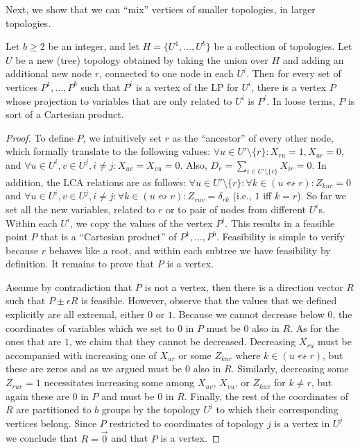 Next, we show that we can ``mix'' vertices of smaller topologies, in larger topologies.

\begin{theorem}
\label{theorem_combine_trees}
Let $b \ge 2$ be an integer, and let $H = \{ U^1,\ldots,U^b \} $ be a collection of topologies. Let $U$ be a new (tree) topology 
obtained by taking the union over $H$ and adding an additional new node $r$, connected to one node in each $U^i$.
 Then for every set of vertices $P^1,\ldots,P^b$ such that $P^i$ is a vertex of the LP for $U^i$, there is a vertex $P$ whose projection to variables that are only related to $U^i$ is $P^i$. In loose terms, $P$ is sort of a Cartesian product.
\end{theorem}

\begin{proof}
To define $P$, we intuitively set $r$ as the ``ancestor'' of every other node, which formally translate to the following values: $\forall u \in U' \setminus \{r\}: X_{ru} = 1, X_{ur} = 0$, and $\forall u \in U^i, v \in U^j, i \ne j: X_{uv}=X_{vu}=0$. Also, $D_r = \sum_{i \in U' \setminus\{r\}}{X_{ir}} = 0$. In addition, the LCA relations are as follows: $\forall u \in U' \setminus \{r\}: \forall k \in (u \leftrightsquigarrow r): Z_{kur}  = 0$ and $\forall u \in U^i, v \in U^j, i \ne j: \forall k \in (u \leftrightsquigarrow v): Z_{ruv}  = \delta_{rk}$ (i.e., $1$ iff $k=r$). So far we set  all the new variables, related to $r$ or to pair of nodes from different $U^i$s. Within each $U^i$, we copy the values of the vertex $P^i$. This results in a feasible point $P$ that is a ``Cartesian product'' of $P^1,\ldots,P^b$. Feasibility is simple to verify because $r$ behaves like a root, and within each subtree we have feasibility by definition. It remains to prove that $P$ is a vertex.

Assume by contradiction that $P$ is not a vertex, then there is a direction vector $R$ such that $P \pm \epsilon R$ is feasible. However, observe that the values that we defined explicitly are all extremal, either $0$ or $1$. Because we cannot decrease below $0$, the coordinates of variables which we set to $0$ in $P$ must be $0$ also in $R$. As for the ones that are $1$, we claim that they cannot be decreased. Decreasing $X_{ru}$ must be accompanied with increasing one of $X_{ur}$ or some $Z_{kur}$ where $k \in (u \leftrightsquigarrow r)$, but these are zeros and as we argued must be $0$ also in $R$. Similarly, decreasing some $Z_{ruv} = 1$ necessitates increasing some among $X_{uv}$, $X_{vu}$, or $Z_{kuv}$ for $k \ne r$, but again these are
$0$ in $P$ and must be $0$ in $R$. Finally, the rest of the coordinates of $R$ are partitioned to $b$ groups by the topology $U^i$ to which their corresponding vertices belong. Since $P$ restricted to coordinates of topology $j$ is a vertex in $U^j$ we conclude that $R = \vec{0}$ and that $P$ is a vertex. 
\end{proof}


